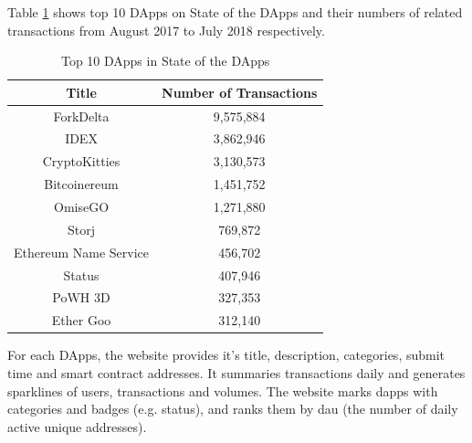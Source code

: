  Table \ref{tab:Top 10 Dapps in State of the ÐApps} shows top 10 \ac{DApps} on State of the \ac{DApps}
and their numbers of related transactions from August 2017 to July
2018 respectively.
\begin{table}[H]
\centering
\caption{Top 10 \ac{DApps} in State of the \ac{DApps}}
\begin{tabular}{|c|c|}
\hline
\textbf{Title} & \textbf{Number of Transactions} \\
\hline
ForkDelta & 9,575,884 \\
\hline
IDEX & 3,862,946  \\
\hline
CryptoKitties & 3,130,573  \\
\hline
Bitcoinereum & 1,451,752 \\
\hline
OmiseGO & 1,271,880 \\
\hline
Storj & 769,872 \\
\hline
Ethereum Name Service & 456,702 \\
\hline 
Status & 407,946 \\
\hline
PoWH 3D & 327,353 \\
\hline
Ether Goo & 312,140 \\ \hline
\end{tabular}
\label{tab:Top 10 Dapps in State of the ÐApps}
\end{table}
For each \ac{DApps}, the website provides it’s title, description, categories, submit time and smart contract addresses. It summaries
transactions daily and generates sparklines of users, transactions
and volumes. The website marks dapps with categories and badges
(e.g. status), and ranks them by dau (the number of daily active
unique addresses).